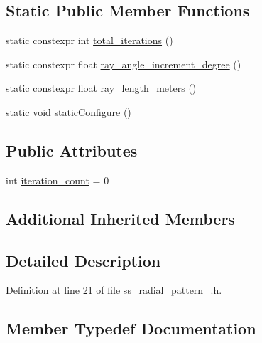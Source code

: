\subsection*{Static Public Member Functions}
\begin{DoxyCompactItemize}
\item 
static constexpr int \hyperlink{structsm__dance__bot__3_1_1SS1_1_1SsRadialPattern1_af4870b0b2df001e0e43dc789f7a6f033}{total\+\_\+iterations} ()
\item 
static constexpr float \hyperlink{structsm__dance__bot__3_1_1SS1_1_1SsRadialPattern1_a19fe411682c3f4bdac7ca7963d6a2d1f}{ray\+\_\+angle\+\_\+increment\+\_\+degree} ()
\item 
static constexpr float \hyperlink{structsm__dance__bot__3_1_1SS1_1_1SsRadialPattern1_a96436c402a6540ad6c12c1846699ad2e}{ray\+\_\+length\+\_\+meters} ()
\item 
static void \hyperlink{structsm__dance__bot__3_1_1SS1_1_1SsRadialPattern1_ab419fa4fdd2501b33536409f0d85629c}{static\+Configure} ()
\end{DoxyCompactItemize}
\subsection*{Public Attributes}
\begin{DoxyCompactItemize}
\item 
int \hyperlink{structsm__dance__bot__3_1_1SS1_1_1SsRadialPattern1_a65f1fba9b7a18750484142c533514a70}{iteration\+\_\+count} = 0
\end{DoxyCompactItemize}
\subsection*{Additional Inherited Members}


\subsection{Detailed Description}


Definition at line 21 of file ss\+\_\+radial\+\_\+pattern\+\_.\+h.



\subsection{Member Typedef Documentation}
